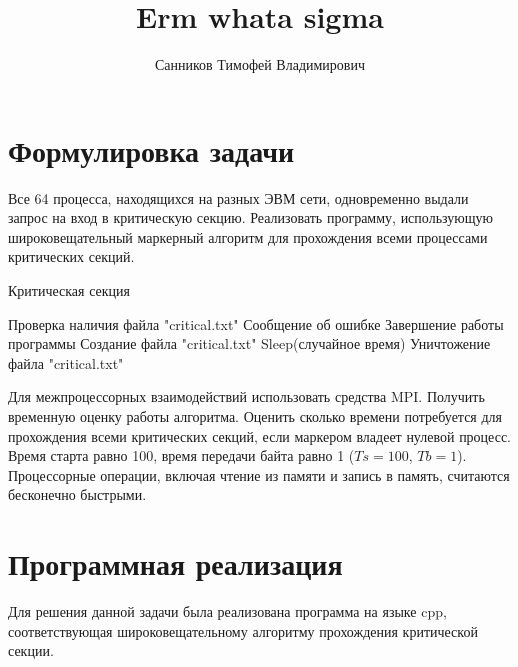 \documentclass[openany, twoside, a4paper, 12pt]{extbook}
\author{Санников Тимофей Владимирович}
\title{Erm whata sigma}
\begin{document}
	\maketitle

	\section*{Формулировка задачи}
	Все 64 процесса, находящихся на разных ЭВМ сети,
	одновременно выдали запрос на вход в критическую секцию.
	Реализовать программу,
	использующую широковещательный маркерный алгоритм для прохождения всеми процессами критических секций.
	
	\begin{algorithm}[b]
		\caption{Критическая секция}
		\begin{algorithmic}[1]
		    \STATE Проверка наличия файла "critical.txt"
		        \STATE Сообщение об ошибке
		        \STATE Завершение работы программы
		    \ELSE
		        \STATE Создание файла "critical.txt"
		        \STATE Sleep(случайное время)
		        \STATE Уничтожение файла "critical.txt"
		    \ENDIF
		\end{algorithmic}
	\end{algorithm}

	Для межпроцессорных взаимодействий использовать средства MPI.\@
	Получить временную оценку работы алгоритма.
	Оценить сколько времени потребуется для прохождения всеми критических секций,
	если маркером владеет нулевой процесс.
	Время старта равно 100, время передачи байта равно 1 ($ Ts=100 $, $ Tb=1 $).
	Процессорные операции, включая чтение из памяти и запись в память,
	считаются бесконечно быстрыми.

	\section*{Программная реализация}
	Для решения данной задачи была реализована программа на языке cpp, соответствующая
	широковещательному алгоритму прохождения критической секции.
\end{document}
